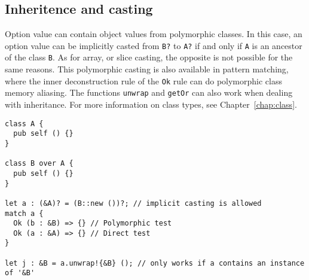\subsection{Inheritence and casting}

Option value can contain object values from polymorphic classes. In this case,
an option value can be implicitly casted from \texttt{B?} to \texttt{A?} if and
only if \texttt{A} is an ancestor of the class \texttt{B}. As for array, or
slice casting, the opposite is not possible for the same reasons. This
polymorphic casting is also available in pattern matching, where the inner
deconstruction rule of the \texttt{Ok} rule can do polymorphic class memory
aliasing. The functions \texttt{unwrap} and \texttt{getOr} can also work when
dealing with inheritance. For more information on class types, see
Chapter~\ref{chap:class}.

\begin{lstlisting}[style=coloredverbatim]
class A {
  pub self () {}
}

class B over A {
  pub self () {}
}

let a : (&A)? = (B::new ())?; // implicit casting is allowed
match a {
  Ok (b : &B) => {} // Polymorphic test
  Ok (a : &A) => {} // Direct test
}

let j : &B = a.unwrap!{&B} (); // only works if a contains an instance of '&B'
\end{lstlisting}
